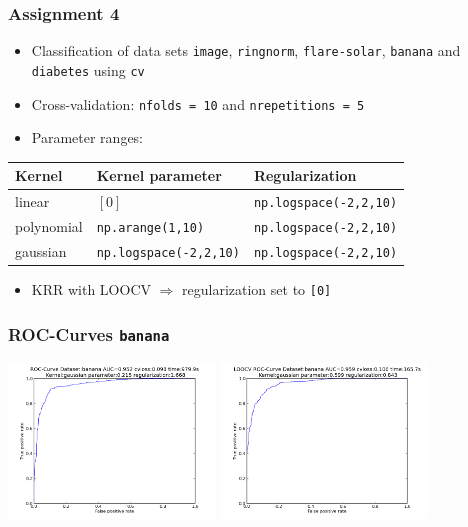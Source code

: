 \begin{frame}
	\frametitle{Assignment 4}
	\begin{itemize}
		\item Classification of data sets \texttt{image}, \texttt{ringnorm}, \texttt{flare-solar}, \texttt{banana} and \texttt{diabetes} using \texttt{cv}
		\item Cross-validation: \texttt{nfolds = 10} and \texttt{nrepetitions = 5}
		\item Parameter ranges:
	\end{itemize}
	\begin{table}
		\centering
		\begin{tabular}{lll}
			Kernel & Kernel parameter & Regularization\\
			\hline
			linear & $[0]$ & \texttt{np.logspace(-2,2,10)} \\
			polynomial & \texttt{np.arange(1,10)} & \texttt{np.logspace(-2,2,10)}\\
			gaussian & \texttt{np.logspace(-2,2,10)} & \texttt{np.logspace(-2,2,10)}
		\end{tabular}
	\end{table}
	
	\begin{itemize}
		\item KRR with LOOCV $\Rightarrow$ regularization set to \texttt{[0]}
	\end{itemize}
\end{frame}

\begin{frame}
	\frametitle{ROC-Curves \texttt{banana}}
	\includegraphics[width=5.5cm]{../report/images/banana.png}
	\includegraphics[width=5.5cm]{../report/images/bananaLOOCV.png}
\end{frame}


